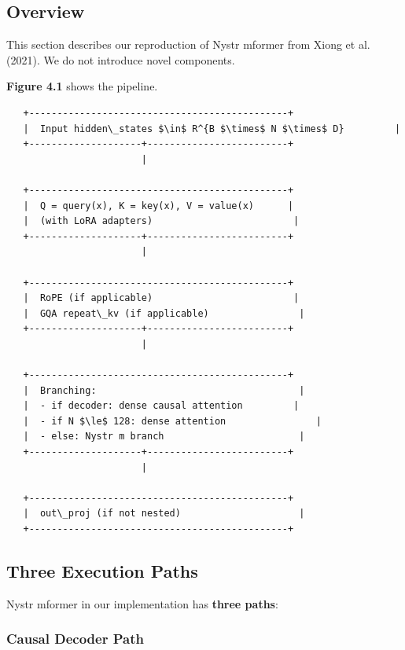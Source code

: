 \subsection{Overview}

This section describes our reproduction of Nystr mformer from Xiong et al. 
(2021). We do not introduce novel components.

\textbf{Figure 4.1} shows the pipeline.

\begin{lstlisting}
   +----------------------------------------------+
   |  Input hidden\_states $\in$ R^{B $\times$ N $\times$ D}         |
   +--------------------+-------------------------+
                        |
                         
   +----------------------------------------------+
   |  Q = query(x), K = key(x), V = value(x)      |
   |  (with LoRA adapters)                         |
   +--------------------+-------------------------+
                        |
                         
   +----------------------------------------------+
   |  RoPE (if applicable)                         |
   |  GQA repeat\_kv (if applicable)                |
   +--------------------+-------------------------+
                        |
                         
   +----------------------------------------------+
   |  Branching:                                    |
   |  - if decoder: dense causal attention         |
   |  - if N $\le$ 128: dense attention                |
   |  - else: Nystr m branch                        |
   +--------------------+-------------------------+
                        |
                         
   +----------------------------------------------+
   |  out\_proj (if not nested)                     |
   +----------------------------------------------+
\end{lstlisting}

\subsection{Three Execution Paths}

Nystr mformer in our implementation has \textbf{three paths}:

\subsubsection{Causal Decoder Path}

